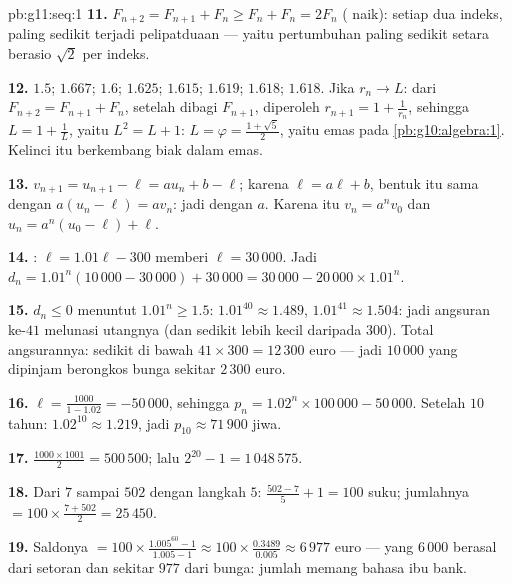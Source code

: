 \begin{solution}{pb:g11:seq:1}
\textbf{11.} $F_{n+2} = F_{n+1} + F_n \geq F_n + F_n = 2F_n$
( naik): setiap dua indeks, paling sedikit terjadi
pelipatduaan --- yaitu pertumbuhan paling sedikit setara  berasio
$\sqrt2$ per indeks.

\textbf{12.} $1.5$; $1.667$; $1.6$; $1.625$; $1.615$;
$1.619$; $1.618$; $1.618$. Jika $r_n \to L$: dari
$F_{n+2} = F_{n+1} + F_n$, setelah dibagi $F_{n+1}$, diperoleh
$r_{n+1} = 1 + \frac{1}{r_n}$, sehingga $L = 1 + \frac1L$, yaitu
$L^2 = L + 1$: $L = \varphi = \frac{1 + \sqrt5}{2}$, yaitu 
emas pada \cref{pb:g10:algebra:1}. Kelinci itu berkembang biak dalam
emas.

\textbf{13.} $v_{n+1} = u_{n+1} - \ell = a u_n + b - \ell$;
karena $\ell = a\ell + b$, bentuk itu sama dengan $a(u_n - \ell) = a v_n$:
jadi  dengan  $a$. Karena itu $v_n = a^n v_0$ dan
$u_n = a^n (u_0 - \ell) + \ell$.

\textbf{14.} : $\ell = 1.01\ell - 300$ memberi
$\ell = 30\,000$. Jadi
$d_n = 1.01^n (10\,000 - 30\,000) + 30\,000
= 30\,000 - 20\,000 \times 1.01^n$.

\textbf{15.} $d_n \leq 0$ menuntut $1.01^n \geq 1.5$:
$1.01^{40} \approx 1.489$, $1.01^{41} \approx 1.504$: jadi angsuran
ke-$41$ melunasi utangnya (dan sedikit lebih kecil daripada
$300$). Total angsurannya: sedikit di bawah $41 \times 300 = 12\,300$
euro --- jadi $10\,000$ yang dipinjam berongkos bunga sekitar
$2\,300$ euro.

\textbf{16.}  $\ell = \frac{1000}{1 - 1.02} =
-50\,000$, sehingga $p_n = 1.02^n \times 100\,000 - 50\,000$. Setelah
$10$ tahun: $1.02^{10} \approx 1.219$, jadi
$p_{10} \approx 71\,900$ jiwa.

\textbf{17.} $\frac{1000 \times 1001}{2} = 500\,500$; lalu
$2^{20} - 1 = 1\,048\,575$.

\textbf{18.} Dari $7$ sampai $502$ dengan langkah $5$:
$\frac{502 - 7}{5} + 1 = 100$ suku; jumlahnya
$= 100 \times \frac{7 + 502}{2} = 25\,450$.

\textbf{19.} Saldonya $= 100 \times \frac{1.005^{60} - 1}
{1.005 - 1} \approx 100 \times \frac{0.3489}{0.005} \approx
6\,977$ euro --- yang $6\,000$ berasal dari setoran dan sekitar $977$
dari bunga: jumlah  memang bahasa ibu bank.


\end{solution}
